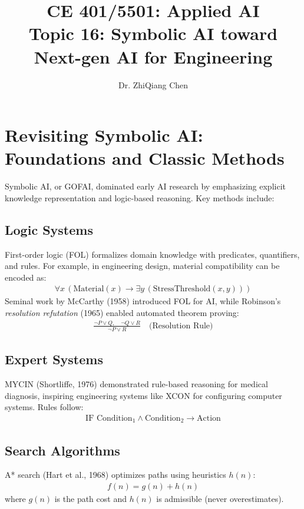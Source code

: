 \documentclass[12pt]{article}
\begin{document}
\doublespacing	

\title{CE 401/5501: Applied AI \\ \large Topic 16: Symbolic AI toward Next-gen AI for Engineering}
\author{Dr. ZhiQiang Chen}
\date{}
\maketitle


\section{Revisiting Symbolic AI: Foundations and Classic Methods}
\label{sec:gofai}
Symbolic AI, or GOFAI, dominated early AI research by emphasizing explicit knowledge representation and logic-based reasoning. Key methods include:

\subsection{Logic Systems}
First-order logic (FOL) formalizes domain knowledge with predicates, quantifiers, and rules. For example, in engineering design, material compatibility can be encoded as:
\begin{align}
\forall x \, (\text{Material}(x) \rightarrow \exists y \, (\text{StressThreshold}(x, y)))
\end{align}
Seminal work by McCarthy (1958) introduced FOL for AI, while Robinson’s \textit{resolution refutation} (1965) enabled automated theorem proving:
\begin{align}
\frac{\neg P \vee Q, \quad \neg Q \vee R}{\neg P \vee R} \quad \text{(Resolution Rule)}
\end{align}

\subsection{Expert Systems}
MYCIN (Shortliffe, 1976) demonstrated rule-based reasoning for medical diagnosis, inspiring engineering systems like XCON for configuring computer systems. Rules follow:
\begin{align}
\text{IF } \text{Condition}_1 \land \text{Condition}_2 \rightarrow \text{Action}
\end{align}

\subsection{Search Algorithms}
A* search (Hart et al., 1968) optimizes paths using heuristics \( h(n) \):
\begin{align}
f(n) = g(n) + h(n)
\end{align}
where \( g(n) \) is the path cost and \( h(n) \) is admissible (never overestimates).
\end{document}
